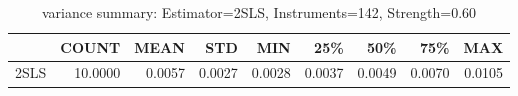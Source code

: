 \begin{table}[ht]
\centering
\caption{variance summary: Estimator=2SLS, Instruments=142, Strength=0.60}
\begin{tabular}{lrrrrrrrr}
\toprule
 & COUNT & MEAN & STD & MIN & 25\% & 50\% & 75\% & MAX \\
\midrule
2SLS & 10.0000 & 0.0057 & 0.0027 & 0.0028 & 0.0037 & 0.0049 & 0.0070 & 0.0105 \\
\bottomrule
\end{tabular}
\end{table}
